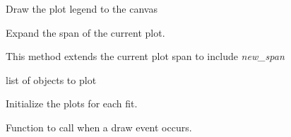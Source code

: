 \documentclass[a4paper,10pt,english]{sphinxmanual}
\begin{document}
\begin{fulllineitems}
\begin{fulllineitems}
\begin{quote}
\begin{description}
\begin{itemize}
\end{itemize}

\end{description}\end{quote}

\end{fulllineitems}


\begin{fulllineitems}
\label{module_doc:kafe.plot.Plot.draw_legend}
Draw the plot legend to the canvas

\end{fulllineitems}


\begin{fulllineitems}
\label{module_doc:kafe.plot.Plot.extend_span}
Expand the span of the current plot.

This method extends the current plot span to include \emph{new\_span}

\end{fulllineitems}


\begin{fulllineitems}
\label{module_doc:kafe.plot.Plot.fits}
list of  objects to plot

\end{fulllineitems}


\begin{fulllineitems}
\label{module_doc:kafe.plot.Plot.init_plots}
Initialize the plots for each fit.

\end{fulllineitems}


\begin{fulllineitems}
\label{module_doc:kafe.plot.Plot.on_draw}
Function to call when a draw event occurs.

\end{fulllineitems}


\end{fulllineitems}
\end{document}
